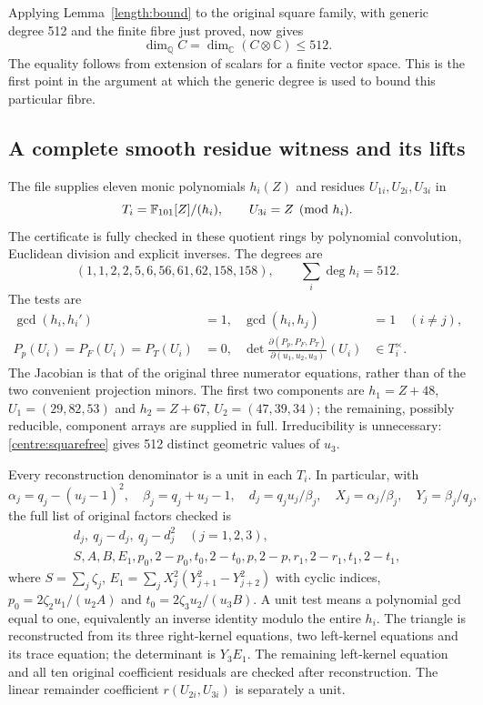 \documentclass[11pt,a4paper]{article}
\theoremstyle{remark}\newtheorem{remark}[theorem]{Remark}
\begin{document}
Applying Lemma~\ref{length:bound} to the original square family, with
generic degree 512 and the finite fibre just proved, now gives
\begin{equation}\label{centre:upper}
 \dim_{\mathbb Q}C=\dim_{\mathbb C}(C\otimes\mathbb C)\le512.
\end{equation}
The equality follows from extension of scalars for a finite vector space.
This is the first point in the argument at which the generic degree is
used to bound this particular fibre.

\subsection{A complete smooth residue witness and its lifts}
The file  supplies eleven monic polynomials
$h_i(Z)$ and residues $U_{1i},U_{2i},U_{3i}$ in
\[
 T_i=\mathbb F_{101}[Z]/(h_i),\qquad U_{3i}=Z\pmod {h_i}.
\]
The certificate is fully checked in these quotient rings by polynomial
convolution, Euclidean division and explicit inverses. The degrees are
\begin{equation}\label{centre:degrees}
 (1,1,2,2,5,6,56,61,62,158,158),\qquad\sum_i\deg h_i=512.
\end{equation}
The tests are
\begin{align}
 \gcd(h_i,h_i')&=1,&\gcd(h_i,h_j)&=1\quad(i\ne j),\label{centre:squarefree}\\
 P_p(U_i)=P_F(U_i)=P_T(U_i)&=0,&
 \det\frac{\partial(P_p,P_F,P_T)}{\partial(u_1,u_2,u_3)}(U_i)&\in T_i^\times.
 \label{centre:smooth}
\end{align}
The Jacobian is that of the original three numerator equations, rather
than of the two convenient projection minors. The first two components
are $h_1=Z+48$, $U_1=(29,82,53)$ and $h_2=Z+67$,
$U_2=(47,39,34)$; the remaining, possibly reducible, component arrays
are supplied in full. Irreducibility is unnecessary:
\eqref{centre:squarefree} gives 512 distinct geometric values of $u_3$.

Every reconstruction denominator is a unit in each $T_i$. In particular,
with
\[
 \alpha_j=q_j-(u_j-1)^2,\quad\beta_j=q_j+u_j-1,\quad
 d_j=q_ju_j/\beta_j,\quad X_j=\alpha_j/\beta_j,\quad Y_j=\beta_j/q_j,
\]
the full list of original factors checked is
\begin{equation}\label{centre:23}
 \begin{gathered}
 d_j,\ q_j-d_j,\ q_j-d_j^2\quad(j=1,2,3),\\
 S,A,B,E_1,p_0,2-p_0,t_0,2-t_0,p,2-p,r_1,2-r_1,t_1,2-t_1,
 \end{gathered}
\end{equation}
where $S=\sum_j\zeta_j$, $E_1=\sum_jX_j^2(Y_{j+1}^2-Y_{j+2}^2)$
with cyclic indices, $p_0=2\zeta_2u_1/(u_2A)$ and
$t_0=2\zeta_3u_2/(u_3B)$. A unit test means a polynomial gcd equal to
one, equivalently an inverse identity modulo the entire $h_i$.
The triangle is reconstructed from its three right-kernel equations,
two left-kernel equations and its trace equation; the determinant is
$Y_3E_1$. The remaining left-kernel equation and all ten original
coefficient residuals are checked after reconstruction. The linear
remainder coefficient $r(U_{2i},U_{3i})$ is separately a unit.
\end{document}
